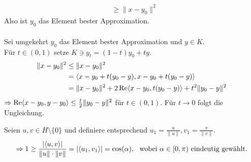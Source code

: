 \begin{beweis}
\begin{enumerate}[label=\alph*\upshape)]
\begin{align*}
								& \geq \| x - y_{0} \|^{2}
			\end{align*}
			Also ist $y_{0}$ das Element bester Approximation. \\ \\
			Sei umgekehrt $y_{0}$ das Element bester Approximation und $y \in K$. \\
			Für $t \in (0, 1)$ setze $ K \ni y_{t} = ( 1 - t ) y_{0} + t y$.
			\begin{align*}
				\| x - y_{0} \|^{2} & \leq \| x - y_{0} \|^{2} \\
									& = \langle x - y_{0} + t ( y_{0} - y ), x - y_{0} + t ( y_{0}  - y ) \rangle \\
									& = \| x - y_{0} \|^{2} + 2 \mathop{\rm Re}\nolimits \langle  x - y_{0}, t ( y_{0} - y ) \rangle + t^{2} \| y_{0} - y \|^{2}
			\end{align*}
			$\Rightarrow \mathop{\rm Re}\nolimits \langle x - y_{0}, y - y_{0} \rangle \leq \frac{t}{2} \| y_{0} - y \|^{2}$ für $t \in (0, 1)$. Für $t \rightarrow 0$ folgt die Ungleichung.
	\end{enumerate}
\end{beweis}


\begin{bemerkung}
		Seien $u, v \in H \setminus \{ 0 \}$ und definiere entsprechend $u_{1} = \frac{u}{\| u \|}, v_{1} = \frac{v}{\| v \|}$.
		\[ \Rightarrow 1 \geq \frac{|\< u, v \>|}{\|u \| \cdot \| v \|} = | \< u_{1}, v_{1} \> | = \cos(\alpha), \text{ wobei } \alpha \in [0, \pi) \text{ eindeutig gewählt.} \]
\end{bemerkung}



\newpage